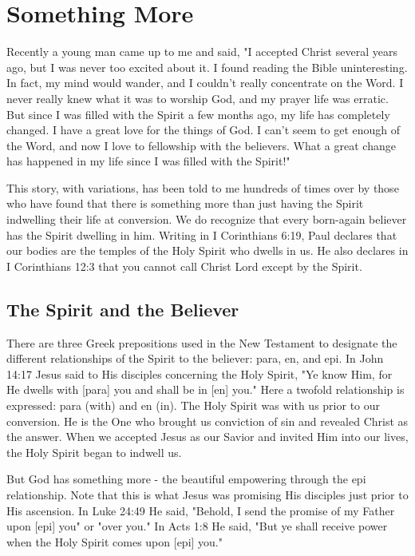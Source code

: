 \chapter{Something More}

Recently a young man came up to me and said, "I accepted Christ several years ago, but I was never too excited about it. I found reading the Bible uninteresting. In fact, my mind would wander, and I couldn't really concentrate on the Word. I never really knew what it was to worship God, and my prayer life was erratic. But since I was filled with the Spirit a few months ago, my life has completely changed. I have a great love for the things of God. I can't seem to get enough of the Word, and now I love to fellowship with the believers. What a great change has happened in my life since I was filled with the Spirit!" 

This story, with variations, has been told to me hundreds of times over by those who have found that there is something more than just having the Spirit indwelling their life at conversion. We do recognize that every born-again believer has the Spirit dwelling in him. Writing in I Corinthians 6:19, Paul declares that our bodies are the temples of the Holy Spirit who dwells in us. He also declares in I Corinthians 12:3 that you cannot call Christ Lord except by the Spirit. 

\section*{The Spirit and the Believer}

There are three Greek prepositions used in the New Testament to designate the different relationships of the Spirit to the believer: para, en, and epi. In John 14:17 Jesus said to His disciples concerning the Holy Spirit, "Ye know Him, for He dwells with [para] you and shall be in [en] you." Here a twofold relationship is expressed: para (with) and en (in). The Holy Spirit was with us prior to our conversion. He is the One who brought us conviction of sin and revealed Christ as the answer. When we accepted Jesus as our Savior and invited Him into our lives, the Holy Spirit began to indwell us. 

But God has something more - the beautiful empowering through the epi relationship. Note that this is what Jesus was promising His disciples just prior to His ascension. In Luke 24:49 He said, "Behold, I send the promise of my Father upon [epi] you" or "over you." In Acts 1:8 He said, "But ye shall receive power when the Holy Spirit comes upon [epi] you." 

